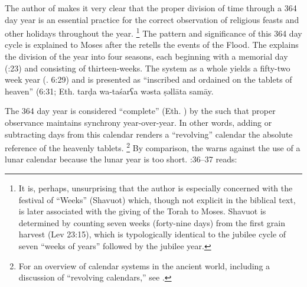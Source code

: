 The author of \jub makes it very clear that the proper division of time through a 364 day year is an essential practice for the correct observation of religious feasts and other holidays throughout the year.%
    \footnote{It is, perhaps, unsurprising that the author is especially concerned with the festival of ``Weeks'' (Shavuot) which, though not explicit in the biblical text, is later associated with the giving of the Torah to Moses. Shavuot is determined by counting seven weeks (forty-nine days) from the first grain harvest (Lev 23:15), which is typologically identical to the jubilee cycle of seven ``weeks of years'' followed by the jubilee year.}
The pattern and significance of this 364 day cycle is explained to Moses after the \ap retells the events of the Flood. The \ap explains the division of the year into four seasons, each beginning with a memorial day (:23) and consisting of thirteen-weeks. The system as a whole yields a fifty-two week year (\jub. 6:29) and is presented as ``inscribed and ordained on the tablets of heaven'' (6:31; Eth.
        {tarḍa wa-taśarʕa wəsta ṣəllāta samāy}.

The 364 day year is considered ``complete'' (Eth. ) by the \ap such that proper observance maintains synchrony year-over-year. In other words, adding or subtracting days from this calendar renders a ``revolving'' calendar \visavis the absolute reference of the heavenly tablets.%
    \footnote{For an overview of calendar systems in the ancient world, including a discussion of ``revolving calendars,'' see \cite[214]{glessmer_flint-vanderkam1999}.}
By comparison, the \ap warns against the use of a lunar calendar because the lunar year is too short. :36--37 reads:

